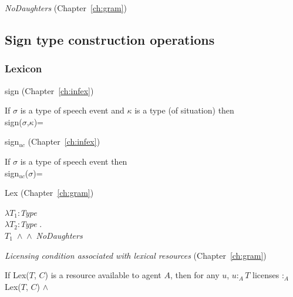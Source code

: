 \textit{NoDaughters} (Chapter~\ref{ch:gram})




\subsection{Sign type construction operations}
\label{app:signtypeconstr}

\subsubsection{Lexicon}
\label{app:lexuniversal}

sign (Chapter~\ref{ch:infex})

If $\sigma$ is a type of speech event and $\kappa$ is a type (of
situation) then \\
sign($\sigma$,$\kappa$)= 

sign$_{\mathit{uc}}$ (Chapter~\ref{ch:infex})

If $\sigma$ is a type of speech event then \\
sign$_{\mathit{uc}}$($\sigma$)= 

Lex (Chapter~\ref{ch:gram})

$\lambda T_1$:\textit{Type}\\
\hspace*{.25em}$\lambda T_2$:\textit{Type} . \\
\hspace*{.5em}\mbox{$T_1$ \d{$\wedge$}
      \d{$\wedge$} \textit{NoDaughters}}

\textit{Licensing condition associated with lexical resources}
(Chapter~\ref{ch:gram})

If Lex($T$, $C$) is a resource available to agent $A$, then for any
$u$, $u:_A T$ licenses $:_A$ Lex($T$, $C$)
\d{$\wedge$}

